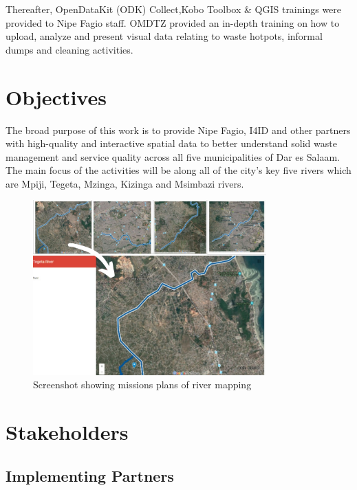 \documentclass[a4paper,12pt,twoside]{article}
\begin{document}
    Thereafter, OpenDataKit (ODK) Collect,Kobo Toolbox & QGIS trainings were provided to Nipe Fagio staff. OMDTZ provided an in-depth training on how to upload, analyze and present visual data relating to waste hotpots, informal dumps and cleaning activities.


\newpage
\section{Objectives}

    The broad purpose of this work is to provide Nipe Fagio, I4ID and other partners with high-quality and interactive spatial data to better understand solid waste management and service quality across all five municipalities of Dar es Salaam. The main focus of the activities will be along all of the city’s key five rivers which are Mpiji, Tegeta, Mzinga, Kizinga and Msimbazi rivers. 

        \begin{figure}%
            \centering
            \includegraphics[width=0.8\textwidth]{images/image14.jpg}
            \caption{Screenshot showing missions plans of river mapping}
        \end{figure}

\section{Stakeholders}

\subsection{Implementing Partners}
\end{document}
